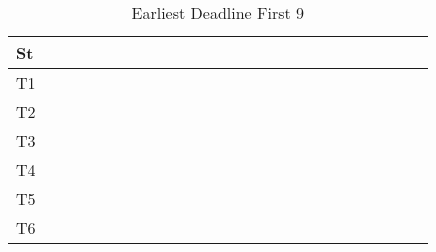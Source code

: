 \documentclass[xcolor=table]{beamer}
\begin{document}
\begin{frame}
\begin{table}
{\begin{tabular}{|l|l|l|l|l|l|l|l|l|l|l|l|l|l|l|l|l|l|l|l|l|l|l|l|l|}
\hline 
St &  \cellcolor{green} &  \cellcolor{green} &  \cellcolor{green} &  \cellcolor{green} &  \cellcolor{green} &  \cellcolor{green} &  \cellcolor{green} &  \cellcolor{green} &  \cellcolor{green} &  \cellcolor{green} &  \cellcolor{green} &  \cellcolor{green} &  \cellcolor{green} &  \cellcolor{green} &  \cellcolor{green} &  \cellcolor{green} &  \cellcolor{green} &  \cellcolor{green} &  \cellcolor{green} &  \cellcolor{green} &  \cellcolor{green} &  \cellcolor{green} &  \cellcolor{green} &  \cellcolor{green} \\ \hline 
T1 & & & & & & & & & & & & & & & & & & & & & & & & \\ \hline 
T2 & & & & & & & & & & & & & & & \cellcolor{purple} & \cellcolor{purple} & \cellcolor{purple} & \cellcolor{purple} & \cellcolor{purple} & \cellcolor{purple} & \cellcolor{purple} & \cellcolor{purple} & \cellcolor{purple} & \cellcolor{purple} \\ \hline 
T3 & \cellcolor{cyan} & \cellcolor{cyan} & \cellcolor{cyan} & \cellcolor{cyan} & \cellcolor{cyan} & \cellcolor{cyan} & \cellcolor{cyan} & \cellcolor{cyan} & \cellcolor{cyan} & \cellcolor{cyan} & \cellcolor{cyan} & \cellcolor{cyan} & \cellcolor{cyan} & \cellcolor{cyan} & & & & & & & & & & \\ \hline 
T4 & & & & & & & & & & & & & & & & & & & & & & & & \\ \hline 
T5 & & & & & & & & & & & & & & & & & & & & & & & & \\ \hline 
T6 & & & & & & & & & & & & & & & & & & & & & & & & \\ \hline 
\end{tabular} 
} 
\caption{ Earliest Deadline First 9 } 
\end{table} 
\begin{table} 
\centering 
{}
\end{table}
\end{frame}
\end{document}
